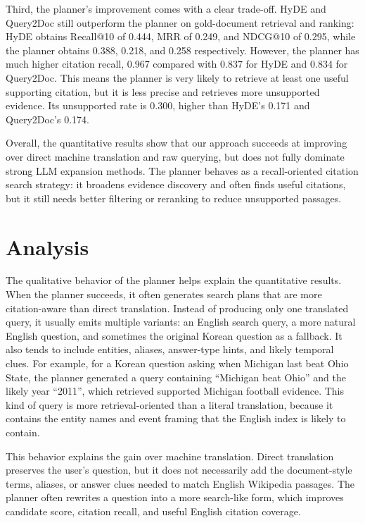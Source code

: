 Third, the planner's improvement comes with a clear trade-off. HyDE and Query2Doc still outperform the planner on gold-document retrieval and ranking: HyDE obtains Recall@10 of 0.444, MRR of 0.249, and NDCG@10 of 0.295, while the planner obtains 0.388, 0.218, and 0.258 respectively. However, the planner has much higher citation recall, 0.967 compared with 0.837 for HyDE and 0.834 for Query2Doc. This means the planner is very likely to retrieve at least one useful supporting citation, but it is less precise and retrieves more unsupported evidence. Its unsupported rate is 0.300, higher than HyDE's 0.171 and Query2Doc's 0.174.

Overall, the quantitative results show that our approach succeeds at improving over direct machine translation and raw querying, but does not fully dominate strong LLM expansion methods. The planner behaves as a recall-oriented citation search strategy: it broadens evidence discovery and often finds useful citations, but it still needs better filtering or reranking to reduce unsupported passages.

\section{Analysis}
\label{sec:analysis}

The qualitative behavior of the planner helps explain the quantitative results. When the planner succeeds, it often generates search plans that are more citation-aware than direct translation. Instead of producing only one translated query, it usually emits multiple variants: an English search query, a more natural English question, and sometimes the original Korean question as a fallback. It also tends to include entities, aliases, answer-type hints, and likely temporal clues. For example, for a Korean question asking when Michigan last beat Ohio State, the planner generated a query containing ``Michigan beat Ohio'' and the likely year ``2011'', which retrieved supported Michigan football evidence. This kind of query is more retrieval-oriented than a literal translation, because it contains the entity names and event framing that the English index is likely to contain.

This behavior explains the gain over machine translation. Direct translation preserves the user's question, but it does not necessarily add the document-style terms, aliases, or answer clues needed to match English Wikipedia passages. The planner often rewrites a question into a more search-like form, which improves candidate score, citation recall, and useful English citation coverage.

